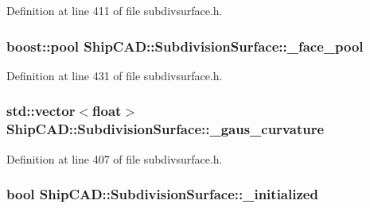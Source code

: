 Definition at line 411 of file subdivsurface.\-h.

\hypertarget{classShipCAD_1_1SubdivisionSurface_a2f746c1c19594b1baa03e9c49c9ffd0a}{
\subsubsection[{\-\_\-face\-\_\-pool}]{\setlength{\rightskip}{0pt plus 5cm}boost\-::pool Ship\-C\-A\-D\-::\-Subdivision\-Surface\-::\-\_\-face\-\_\-pool\hspace{0.3cm}{\ttfamily [protected]}}}\label{classShipCAD_1_1SubdivisionSurface_a2f746c1c19594b1baa03e9c49c9ffd0a}


Definition at line 431 of file subdivsurface.\-h.

\hypertarget{classShipCAD_1_1SubdivisionSurface_a20cbcc689f7b2f8af21f502748521185}{
\subsubsection[{\-\_\-gaus\-\_\-curvature}]{\setlength{\rightskip}{0pt plus 5cm}std\-::vector$<$float$>$ Ship\-C\-A\-D\-::\-Subdivision\-Surface\-::\-\_\-gaus\-\_\-curvature\hspace{0.3cm}{\ttfamily [protected]}}}\label{classShipCAD_1_1SubdivisionSurface_a20cbcc689f7b2f8af21f502748521185}


Definition at line 407 of file subdivsurface.\-h.

\hypertarget{classShipCAD_1_1SubdivisionSurface_a828f85ee49e1481e95f61b919070842c}{
\subsubsection[{\-\_\-initialized}]{\setlength{\rightskip}{0pt plus 5cm}bool Ship\-C\-A\-D\-::\-Subdivision\-Surface\-::\-\_\-initialized\hspace{0.3cm}{\ttfamily [protected]}}}\label{classShipCAD_1_1SubdivisionSurface_a828f85ee49e1481e95f61b919070842c}


